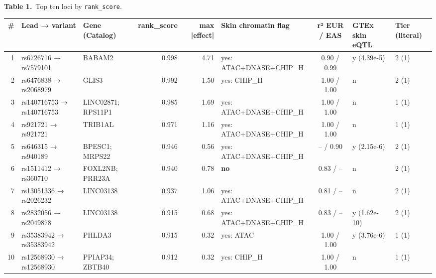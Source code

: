 \documentclass[10pt,twocolumn,a4paper]{article}
\newcommand{\tabcap}[2]{{\sffamily\footnotesize\textbf{#1}\ #2\par}\vspace{4pt}}
\begin{document}
\begin{table}[t]
\centering
\tabcap{Table 1.}{Top ten loci by \texttt{rank\_score}.}
{\scriptsize\setlength{\tabcolsep}{3pt}\renewcommand{\arraystretch}{1.18}
\begin{tabularx}{\textwidth}{@{}rl>{\raggedright\arraybackslash}p{2.7cm}rr>{\raggedright\arraybackslash}Xcll@{}}
\toprule
\textbf{\#} & \textbf{Lead → variant} & \textbf{Gene (Catalog)} & \textbf{rank\_score} & \textbf{max |effect|} & \textbf{Skin chromatin flag} & \textbf{r² EUR / EAS} & \textbf{GTEx skin eQTL} & \textbf{Tier (literal)} \\
\midrule
1 & rs6726716 → rs7579101 & BABAM2 & 0.998 & 4.71 & yes: ATAC+\hspace{0pt}DNASE+\hspace{0pt}CHIP\_H & 0.90 / 0.99 & y (4.39e-5) & 2 (1) \\
2 & rs6476838 → rs2068979 & GLIS3 & 0.992 & 1.50 & yes: CHIP\_H & 1.00 / 1.00 & n & 2 (1) \\
3 & rs140716753 → rs140716753 & LINC02871; RPS11P1 & 0.985 & 1.69 & yes: ATAC+\hspace{0pt}DNASE+\hspace{0pt}CHIP\_H & 1.00 / 1.00 & n & 1 (1) \\
4 & rs921721 → rs921721 & TRIB1AL & 0.971 & 1.16 & yes: ATAC+\hspace{0pt}DNASE+\hspace{0pt}CHIP\_H & 1.00 / 1.00 & n & 1 (1) \\
5 & rs646315 → rs940189 & BPESC1; MRPS22 & 0.946 & 0.56 & yes: ATAC+\hspace{0pt}DNASE+\hspace{0pt}CHIP\_H & – / 0.90 & y (2.15e-6) & 2 (1) \\
6 & rs1511412 → rs360710 & FOXL2NB; PRR23A & 0.940 & 0.78 & \textbf{no} & 0.83 / – & n & 2 (1) \\
7 & rs13051336 → rs2026232 & LINC03138 & 0.937 & 1.06 & yes: ATAC+\hspace{0pt}DNASE+\hspace{0pt}CHIP\_H & 0.81 / – & n & 2 (1) \\
8 & rs2832056 → rs2049878 & LINC03138 & 0.915 & 0.68 & yes: ATAC+\hspace{0pt}DNASE+\hspace{0pt}CHIP\_H & 0.83 / – & y (1.62e-10) & 2 (1) \\
9 & rs35383942 → rs35383942 & PHLDA3 & 0.915 & 0.32 & yes: ATAC & 1.00 / 1.00 & y (3.76e-6) & 1 (1) \\
10 & rs12568930 → rs12568930 & PPIAP34; ZBTB40 & 0.912 & 0.32 & yes: CHIP\_H & 1.00 / 1.00 & n & 1 (1) \\
\bottomrule
\end{tabularx}}
\end{table}
\end{document}
